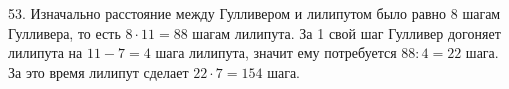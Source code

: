 53. Изначально расстояние между Гулливером и лилипутом было равно 8 шагам Гулливера, то есть $8\cdot11=88$ шагам лилипута. За 1 свой шаг Гулливер догоняет лилипута на $11-7=4$ шага лилипута, значит ему потребуется $88:4=22$ шага. За это время лилипут сделает $22\cdot7=154$ шага.\\
